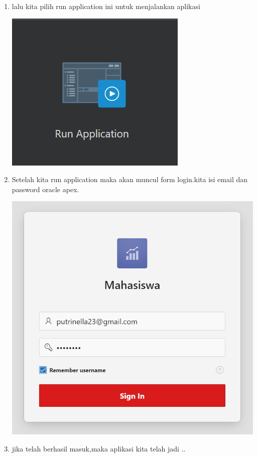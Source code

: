 \documentclass{article}
\begin{document}
\begin{enumerate}
\begin{center}
\end{center}
    \item lalu kita pilih run application ini untuk menjalankan aplikasi
    \begin{center}
    \includegraphics[width=.8\textwidth]{15.PNG}
\end{center}
    \item Setelah kita run application maka akan muncul form login.kita isi email dan password oracle apex.
    \begin{center}
    \includegraphics[width=.8\textwidth]{16.PNG}
\end{center}
    \item jika telah berhasil masuk,maka aplikasi kita telah jadi ..
    \begin{center}

\end{center}
\end{enumerate}
\end{document}

